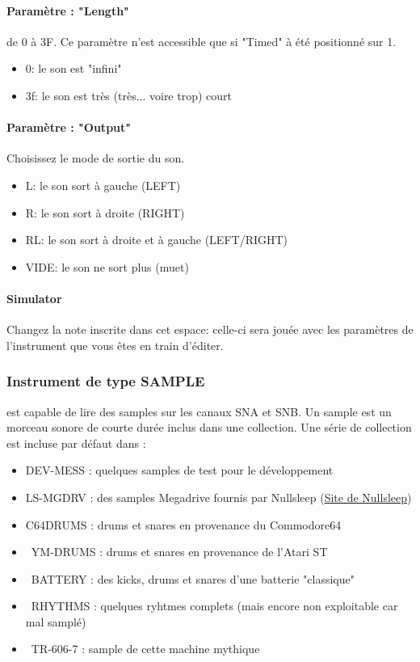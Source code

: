 \paragraph{Paramètre : "Length"} de 0 à 3F.
Ce paramètre n'est accessible que si "Timed" à été positionné sur 1.
\medskip

\begin{itemize}
    \item{0: le son est "infini"}
    \item{3f: le son est très (très... voire trop) court}
\end{itemize}

\paragraph{Paramètre : "Output"} Choisissez le mode de sortie du son.
\medskip
\begin{itemize}
    \item{L: le son sort à gauche (LEFT)}
    \item{R: le son sort à droite (RIGHT)}
    \item{RL: le son sort à droite et à gauche (LEFT/RIGHT)}
    \item{VIDE: le son ne sort plus (muet)}
\end{itemize}

\paragraph{Simulator} Changez la note inscrite dans cet espace:
            celle-ci sera jouée avec les paramètres de l'instrument que vous êtes en train d'éditer.

\subsubsection{Instrument de type SAMPLE}

\FAT est capable de lire des samples sur les canaux SNA et SNB.
Un sample est un morceau sonore de courte durée inclus dans une collection.
Une série de collection est incluse par défaut dans \FAT :\medskip

\begin{itemize}
    \item {DEV-MESS : quelques samples de test pour le développement}
    \item {LS-MGDRV : des samples Megadrive fournis par Nullsleep (\href{http://little-scale.blogspot.fr/2008/08/sega-mega-drive-sample-pack.html}{Site de Nullsleep})}
    \item {C64DRUMS : drums et snares en provenance du Commodore64}
    \item {YM-DRUMS : drums et snares en provenance de l'Atari ST}
    \item {BATTERY : des kicks, drums et snares d'une batterie "classique"}
    \item {RHYTHMS : quelques ryhtmes complets (mais encore non exploitable car mal samplé)}
    \item {TR-606-7 : sample de cette machine mythique}
\end{itemize} \medskip

